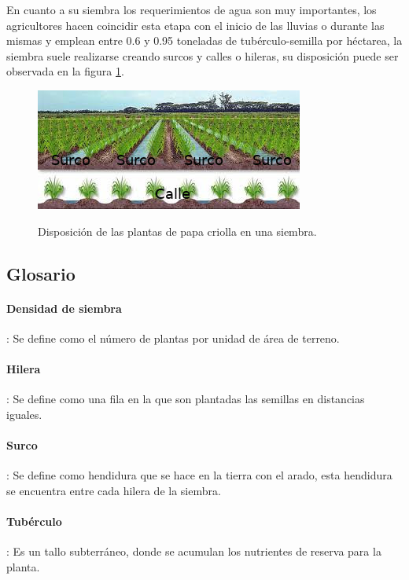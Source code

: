 En cuanto a su siembra los requerimientos de agua son muy importantes, los agricultores hacen coincidir esta etapa con el inicio de las lluvias o durante las mismas y emplean entre 0.6 y 0.95 toneladas de tubérculo-semilla por héctarea, la siembra suele realizarse creando surcos y calles o hileras, su disposición puede ser observada en la figura \ref{fig:surcos}.

\clearpage

\begin{figure}[h!]
	\caption{Disposición de las plantas de papa criolla en una siembra.}
	\centering
	\includegraphics[scale=0.8]{surcos.jpeg}
	\label{fig:surcos}
\end{figure}

\subsection{Glosario}

\paragraph{Densidad de siembra}: Se define como el número de plantas por unidad de área de terreno.

\paragraph{Hilera}: Se define como una fila en la que son plantadas las semillas en distancias iguales.

\paragraph{Surco}: Se define como hendidura que se hace en la tierra con el arado, esta hendidura se encuentra entre cada hilera de la siembra.

\paragraph{Tubérculo}: Es un tallo subterráneo, donde se acumulan los nutrientes de reserva para la planta.




